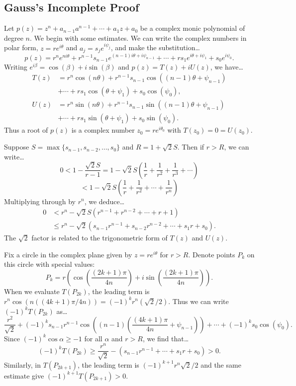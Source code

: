 \subsection{Gauss's Incomplete Proof}\label{gaussproofofFOA}

Let $p(z) = z^n + a_{n-1}a^{n-1} + \cdots + a_1z + a_0$ be a complex monic polynomial of degree $n$. We begin with some
estimates. We can write the complex numbers in polar form, $z = re^{i \theta}$ and $a_j = s_je^{i \psi_j}$, and make the substitution\dots
$$p(z) = r^ne^{ni \theta} + r^{n-1}s_{n-1}e^{(n-1)i \theta + i \psi_{n-1}} + \cdots + rs_1e^{i \theta + i \psi_1} + s_0e^{i \psi_0}.$$
Writing $e^{i \beta} = \cos(\beta) + i \sin(\beta)$ and $p(z) = T(z) + i U(z)$, we have\dots
\begin{align*}
T(z) &= r^n \cos(n \theta) + r^{n-1}s_{n-1} \cos((n-1)\theta + \psi_{n-1})\\
	 &+ \cdots + rs_1 \cos(\theta + \psi_1) + s_0 \cos (\psi_0),\\
U(z) &= r^n \sin(n \theta) + r^{n-1}s_{n-1} \sin((n-1)\theta + \psi_{n-1})\\
	 &+ \cdots + rs_1\sin(\theta + \psi_1) + s_0 \sin(\psi_0).
\end{align*}
Thus a root of $p(z)$ is a complex number $z_0 = re^{i\theta_0}$ with $T(z_0) = 0 = U(z_0)$.

Suppose $S = \max \{ s_{n-1}, s_{n-2}, \dots, s_0\}$ and $R = 1 + \sqrt{2}S$. Then if $r > R$, we can write\dots
$$0 < 1 - \frac{\sqrt{2}S}{r-1} = 1 -\sqrt{2}S\left(\frac{1}{r} + \frac{1}{r^2} + \frac{1}{r^3} + \cdots\right)$$
$$< 1 - \sqrt{2}S\left(\frac{1}{r} + \frac{1}{r^2} + \cdots + \frac{1}{r^n}\right)$$
Multiplying through by $r^n$, we deduce\dots
\begin{align*}
0 &< r^n - \sqrt{2}S(r^{n-1} + r^{n-2} + \cdots + r + 1)\\
  &\leq r^n - \sqrt{2}(s_{n-1}r^{n-1} + s_{n-2}r^{n-2} + \cdots + s_1r + s_0).
\end{align*}
The $\sqrt{2}$ factor is related to the trigonometric form of $T(z)$ and $U(z)$.

Fix a circle in the complex plane given by $z = re^{i \theta}$ for $r > R$. Denote points $P_k$ on this circle with special values:
$$P_k = r \left( \cos\left( \frac{(2k + 1) \pi}{4n}\right) + i \sin \left( \frac{(2k + 1) \pi}{4n} \right) \right).$$
When we evaluate $T(P_{2k})$, the leading term is $r^n \cos(n((4k+1)\pi/4n)) = (-1)^kr^n(\sqrt{2}/2)$. Thus we can write $(-1)^k T(P_{2k})$ as\dots
$$\frac{r^2}{\sqrt{2}} + (-1)^k s_{n-1} r^{n-1} \cos \left( (n-1) \left( \frac{(4k + 1)\pi}{4n} + \psi_{n-1} \right) \right) + \cdots + (-1)^ks_0\cos(\psi_0).$$
Since $(-1)^k \cos \alpha \geq -1$ for all $\alpha$ and $r > R$, we find that\dots
$$(-1)^kT(P_{2k}) \geq \frac{r^n}{\sqrt{2}} - (s_{n-1}r^{n-1} + \cdots + s_1 r + s_0) > 0.$$
Similarly, in $T(P_{2k+1})$, the leading term is $(-1)^{k+1}r^n \sqrt{2}/2$ and the same estimate give $(-1)^{k+1}T(P_{2k+1}) > 0$.


